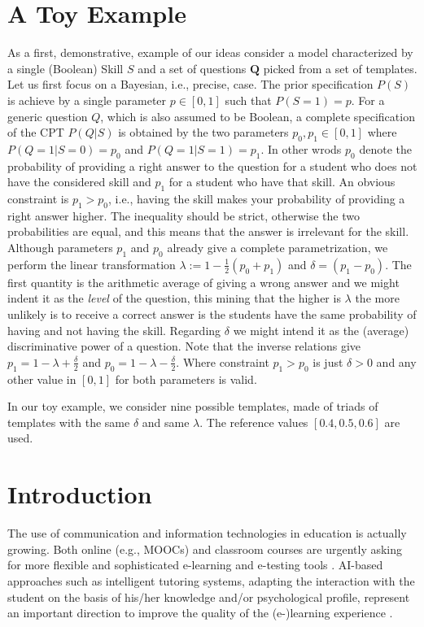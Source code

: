 \documentclass[runningheads]{llncs}
\begin{document}
    \section{A Toy Example}
    As a first, demonstrative, example of our ideas consider a model characterized by a single (Boolean) Skill $S$ and a set of questions $\bm{Q}$ picked from a set of templates. Let us first focus on a Bayesian, i.e., precise, case. The prior specification $P(S)$ is achieve by a single parameter $p \in [0,1]$ such that $P(S=1)=p$. For a generic question $Q$, which is also assumed to be Boolean, a complete specification of the CPT $P(Q|S)$ is obtained by the two parameters $p_0,p_1\in [0,1]$ where $P(Q=1|S=0)=p_0$ and $P(Q=1|S=1)=p_1$. In other wrods $p_0$ denote the probability of providing a right answer to the question for a student who does not have the considered skill and $p_1$ for a student who have that skill. An obvious constraint is $p_1>p_0$, i.e., having the skill makes your probability of providing a right answer higher. The inequality should be strict, otherwise the two probabilities are equal, and this means that the answer is irrelevant for the skill. Although parameters $p_1$ and $p_0$ already give a complete parametrization, we perform the linear transformation
    $\lambda:=1-\frac{1}{2}(p_0+p_1)$ and $\delta=(p_1-p_0)$. The first quantity is the arithmetic average of giving a wrong answer and we might indent it as the \emph{level} of the question, this mining that the higher is $\lambda$ the more unlikely is to receive a correct answer is the students have the same probability of having and not having the skill. Regarding $\delta$ we might intend it as the (average) discriminative power of a question.
    Note that the inverse relations give $p_1=1-\lambda+\frac{\delta}{2}$
    and $p_0=1-\lambda-\frac{\delta}{2}$. Where constraint $p_1>p_0$ is just $\delta>0$ and any other value in $[0,1]$ for both parameters is valid.
    
    
    In our toy example, we consider nine possible templates, made of triads of templates with the same $\delta$ and same $\lambda$. The reference values $[0.4,0.5,0.6]$ are used.
    
    
	
	\section{Introduction}\label{sec:intro}
	The use of communication and information technologies in education is actually 
	growing. Both online (e.g., MOOCs) and classroom courses are urgently asking for 
	more flexible and sophisticated e-learning and e-testing tools 
	\cite{pollard2001exploring}. AI-based approaches such as intelligent tutoring systems, 
	adapting the interaction with the student on the basis of his/her knowledge and/or 
	psychological profile, represent an important direction to improve the quality of the 
	(e-)learning experience \cite{burns2014intelligent}.
	
\end{document}
